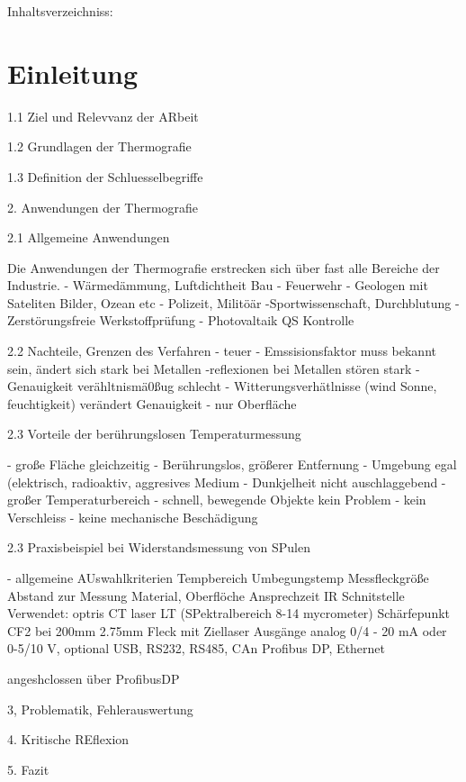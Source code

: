 Inhaltsverzeichniss:

\section{Einleitung}

	1.1 Ziel und Relevvanz der ARbeit

	1.2 Grundlagen der Thermografie

	1.3 Definition der Schluesselbegriffe

2. Anwendungen der Thermografie

	2.1 Allgemeine Anwendungen
		
		Die Anwendungen der Thermografie erstrecken sich über fast alle Bereiche der Industrie.
		- Wärmedämmung, Luftdichtheit Bau
		- Feuerwehr
		- Geologen mit Sateliten Bilder, Ozean etc
		- Polizeit, Militöär
		-Sportwissenschaft, Durchblutung
		- Zerstörungsfreie Werkstoffprüfung
		- Photovaltaik QS Kontrolle
	
	2.2 Nachteile, Grenzen des Verfahren
		- teuer
		- Emssisionsfaktor muss bekannt sein, ändert sich stark bei Metallen
		-reflexionen bei Metallen stören stark
		- Genauigkeit verähltnismä0ßug schlecht
		- Witterungsverhätlnisse (wind Sonne, feuchtigkeit) verändert Genauigkeit
		- nur Oberfläche
	
	
	
	2.3 Vorteile der berührungslosen Temperaturmessung
		
		- große Fläche gleichzeitig
		- Berührungslos, größerer Entfernung
		- Umgebung egal (elektrisch, radioaktiv, aggresives Medium
		- Dunkjelheit nicht auschlaggebend
		- großer Temperaturbereich
		- schnell, bewegende Objekte kein Problem
		- kein Verschleiss
			- keine mechanische Beschädigung
	
	2.3 Praxisbeispiel bei Widerstandsmessung von SPulen
		
		- allgemeine AUswahlkriterien
			Tempbereich
			Umbegungstemp
			Messfleckgröße
			Abstand zur Messung
			Material, Oberflöche
			Ansprechzeit IR
			Schnitstelle
		Verwendet: optris CT laser LT (SPektralbereich 8-14 mycrometer) Schärfepunkt CF2 bei 200mm 2.75mm Fleck mit Ziellaser
		Ausgänge analog 0/4 - 20 mA oder 0-5/10 V,   optional USB, RS232, RS485, CAn Profibus DP, Ethernet

			angeshclossen über ProfibusDP
	
		
	
	
3, Problematik, Fehlerauswertung


4. Kritische REflexion

5. Fazit